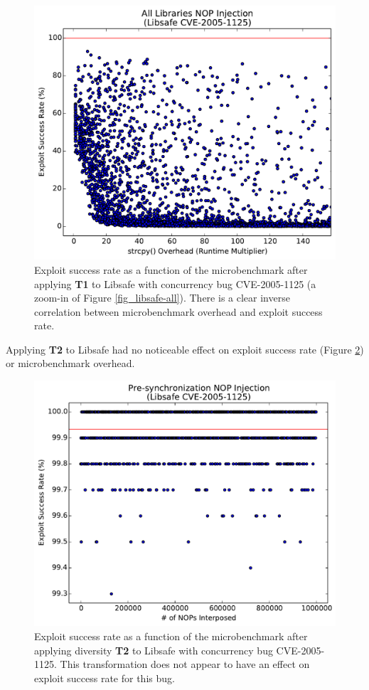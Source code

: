 \begin{figure}
	\centering
	\includegraphics[width=\columnwidth]{figures/libsafe-all-zoom}
	\caption{
		Exploit success rate as a function of the microbenchmark after applying \textbf{T1} to Libsafe with concurrency bug CVE-2005-1125 (a zoom-in of Figure \ref{fig_libsafe-all}).
		There is a clear inverse correlation between microbenchmark overhead and exploit success rate.
	}
	\label{fig_libsafe-all-zoom}
\end{figure}

Applying \textbf{T2} to Libsafe had no noticeable effect on exploit success rate (Figure \ref{fig_libsafe-pre}) or microbenchmark overhead.
\begin{figure}
	\centering
	\includegraphics[width=\columnwidth]{figures/libsafe-pre}
	\caption{
		Exploit success rate as a function of the microbenchmark after applying diversity \textbf{T2} to Libsafe with concurrency bug CVE-2005-1125.
		This transformation does not appear to have an effect on exploit success rate for this bug.
	}
	\label{fig_libsafe-pre}
\end{figure}


